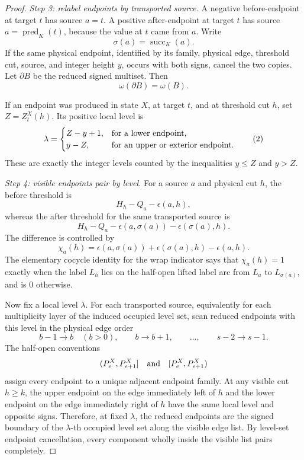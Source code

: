 \documentclass[10pt]{article}
\begin{document}
\begin{proof}
\smallskip
\noindent\emph{Step 3: relabel endpoints by transported source.}
A negative before-endpoint at target \(t\) has source \(a=t\).  A positive
after-endpoint at target \(t\) has source \(a=\operatorname{pred}_K(t)\),
because the value at \(t\) came from \(a\).  Write
\[
  \sigma(a)=\operatorname{succ}_K(a).
\]
If the same physical endpoint, identified by its family, physical edge,
threshold cut, source, and integer height \(y\), occurs with both signs,
cancel the two copies.  Let \(\partial B\) be the reduced signed multiset.
Then
\[
  \omega(\partial B)=\omega(B).
\]

If an endpoint was produced in state \(X\), at target \(t\), and at threshold
cut \(h\), set \(Z=Z_t^X(h)\).  Its positive local level is
\[
  \lambda=
  \begin{cases}
    Z-y+1, & \hbox{for a lower endpoint},\\
    y-Z,   & \hbox{for an upper or exterior endpoint}.
  \end{cases}
  \tag{2}
\]
These are exactly the integer levels counted by the inequalities \(y\le Z\)
and \(y>Z\).

\smallskip
\noindent\emph{Step 4: visible endpoints pair by level.}
For a source \(a\) and physical cut \(h\), the before threshold is
\[
  H_h-Q_a-\epsilon(a,h),
\]
whereas the after threshold for the same transported source is
\[
  H_h-Q_a-\epsilon(a,\sigma(a))-\epsilon(\sigma(a),h).
\]
The difference is controlled by
\[
  \chi_a(h)=
  \epsilon(a,\sigma(a))+\epsilon(\sigma(a),h)-\epsilon(a,h).
  \tag{3}
\]
The elementary cocycle identity for the wrap indicator says that
\(\chi_a(h)=1\) exactly when the label \(L_h\) lies on the half-open lifted
label arc from \(L_a\) to \(L_{\sigma(a)}\), and is \(0\) otherwise.

Now fix a local level \(\lambda\).  For each transported source, equivalently
for each multiplicity layer of the induced occupied level set, scan reduced
endpoints with this level in the physical edge order
\[
  b-1\to b\quad(b>0),\qquad b\to b+1,\qquad\ldots,\qquad s-2\to s-1.
\]
The half-open conventions
\[
  (P_e^X,P_{e+1}^X]\quad\hbox{and}\quad [P_e^X,P_{e+1}^X)
\]
assign every endpoint to a unique adjacent endpoint family.  At any visible
cut \(h\ge k\), the upper endpoint on the edge immediately left of \(h\) and
the lower endpoint on the edge immediately right of \(h\) have the same local
level and opposite signs.  Therefore, at fixed \(\lambda\), the reduced
endpoints are the signed boundary of the \(\lambda\)-th occupied level set
along the visible edge list.  By level-set endpoint cancellation, every
component wholly inside the visible list pairs completely.


\end{proof}
\end{document}
